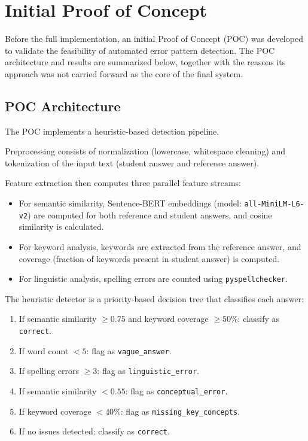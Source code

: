 \section{Initial Proof of Concept}
\label{sec:method_poc}

Before the full implementation, an initial Proof of Concept (POC) was developed to validate the feasibility of automated error pattern detection. The POC architecture and results are summarized below, together with the reasons its approach was not carried forward as the core of the final system.

\subsection{POC Architecture}
\label{sec:method_poc_arch}

The POC implements a heuristic-based detection pipeline.

Preprocessing consists of normalization (lowercase, whitespace cleaning) and tokenization of the input text (student answer and reference answer).

Feature extraction then computes three parallel feature streams:
\begin{itemize}
    \item For semantic similarity, Sentence-BERT embeddings (model: \texttt{all-MiniLM-L6-v2}) are computed for both reference and student answers, and cosine similarity is calculated.
    \item For keyword analysis, keywords are extracted from the reference answer, and coverage (fraction of keywords present in student answer) is computed.
    \item For linguistic analysis, spelling errors are counted using \texttt{pyspellchecker}.
\end{itemize}

The heuristic detector is a priority-based decision tree that classifies each answer:
\begin{enumerate}
    \item If semantic similarity $\geq 0.75$ and keyword coverage $\geq 50\%$: classify as \texttt{correct}.
    \item If word count $< 5$: flag as \texttt{vague\_answer}.
    \item If spelling errors $\geq 3$: flag as \texttt{linguistic\_error}.
    \item If semantic similarity $< 0.55$: flag as \texttt{conceptual\_error}.
    \item If keyword coverage $< 40\%$: flag as \texttt{missing\_key\_concepts}.
    \item If no issues detected: classify as \texttt{correct}.
\end{enumerate}

